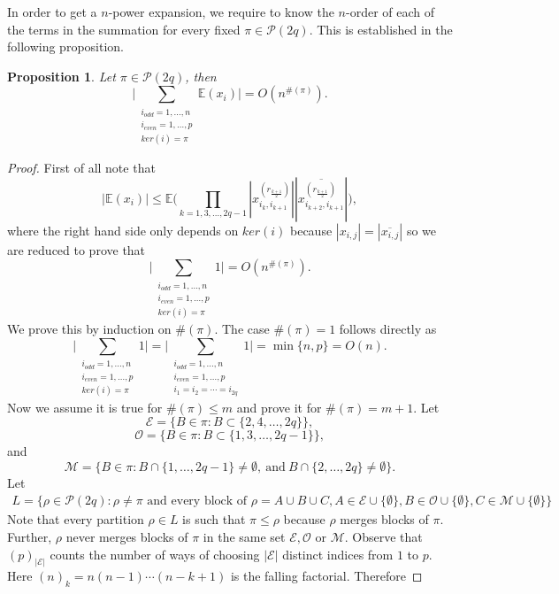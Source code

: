 \documentclass{article}
\newtheorem{proposition}[theorem]{Proposition}
\theoremstyle{definition}
\newcommand{\E}{\mathbb{E}}
\newcommand{\cP}{\mathcal{P}}
\begin{document}
{In order to get a $n$-power expansion, we require to know the $n$-order of each of the terms in the summation for every fixed $\pi\in \cP(2q)$. This is established in the following proposition.

\begin{proposition}\label{Proposition: N order of pi sum}
Let $\pi\in \cP(2q)$, then
$$\Bigg| \sum_{\substack{i_{odd}=1,\dots,n \\ i_{even}=1,\dots,p \\ ker(i)=\pi}}\E(x_i) \Bigg| =O(n^{\#(\pi)}).$$
\end{proposition}
\begin{proof}
First of all note that 
$$|\E(x_i)|\leq \E\Bigg(\prod_{k=1,3,\dots,2q-1}|x_{i_k,i_{k+1}}^{(r_{\frac{k+1}{2}})}||\overline{x_{i_{k+2},i_{k+1}}^{(r_{\frac{k+1}{2}})}}|\Bigg),$$
where the right hand side only depends on $ker(i)$ because $|x_{i,j}|=|\overline{x_{i,j}}|$ so we are reduced to prove that 
$$\Bigg| \sum_{\substack{i_{odd}=1,\dots,n \\ i_{even}=1,\dots,p \\ ker(i)=\pi}}1 \Bigg| =O(n^{\#(\pi)}).$$
We prove this by induction on $\#(\pi)$. The case $\#(\pi)=1$ follows directly as
$$\Bigg| \sum_{\substack{i_{odd}=1,\dots,n \\ i_{even}=1,\dots,p \\ ker(i)=\pi}}1 \Bigg|=\Bigg| \sum_{\substack{i_{odd}=1,\dots,n \\i_{even}=1,\dots,p \\ i_{1}=i_2=\cdots =i_{2q}}}1 \Bigg|=\min\{n,p\} =O(n).$$
Now we assume it is true for $\#(\pi)\leq m$ and prove it for $\#(\pi)=m+1$. 
Let 
$$\mathcal{E}=\{B\in\pi: B\subset \{2,4,\dots,2q\}\},$$
$$\mathcal{O}=\{B\in\pi: B\subset \{1,3,\dots,2q-1\}\},$$
and
$$\mathcal{M}=\{B\in\pi: B\cap \{1,\dots,2q-1\}\neq \emptyset,\ \text{and}\ B\cap \{2,\dots,2q\}\neq \emptyset\}.$$
Let
\begin{multline*}
L=\{\rho\in\cP(2q):\rho\neq\pi \text{ and every block of }\rho=A\cup B\cup C,
A\in \mathcal{E}\cup \{\emptyset\}, B\in \mathcal{O}\cup\{\emptyset\},C\in\mathcal{M}\cup\{\emptyset\}\}
\end{multline*}
Note that every partition $\rho\in L$ is such that $\pi\leq \rho$ because $\rho$ merges blocks of $\pi$. Further, $\rho$ never merges blocks of $\pi$ in the same set $\mathcal{E},\mathcal{O}$ or $\mathcal{M}$. 
Observe that $(p)_{|\mathcal{E}|}$ counts the number of ways of choosing $|\mathcal{E}|$ distinct indices from $1$ to $p$. Here $(n)_k=n(n-1)\cdots (n-k+1)$ is the falling factorial. Therefore

\end{proof}}
\end{document}
